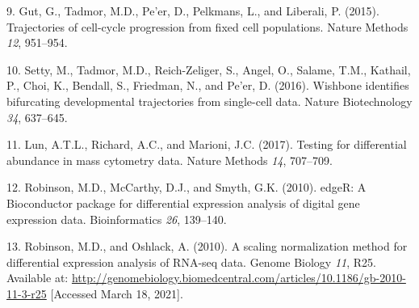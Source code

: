 \documentclass[
]{article}
\newenvironment{cslreferences}%
  {}%
  {\par}
\begin{document}
\begin{cslreferences}
\leavevmode\hypertarget{ref-gutTrajectoriesCellcycleProgression2015}{}%
9. Gut, G., Tadmor, M.D., Pe'er, D., Pelkmans, L., and Liberali, P. (2015). Trajectories of cell-cycle progression from fixed cell populations. Nature Methods \emph{12}, 951--954.

\leavevmode\hypertarget{ref-settyWishboneIdentifiesBifurcating2016}{}%
10. Setty, M., Tadmor, M.D., Reich-Zeliger, S., Angel, O., Salame, T.M., Kathail, P., Choi, K., Bendall, S., Friedman, N., and Pe'er, D. (2016). Wishbone identifies bifurcating developmental trajectories from single-cell data. Nature Biotechnology \emph{34}, 637--645.

\leavevmode\hypertarget{ref-lunTestingDifferentialAbundance2017}{}%
11. Lun, A.T.L., Richard, A.C., and Marioni, J.C. (2017). Testing for differential abundance in mass cytometry data. Nature Methods \emph{14}, 707--709.

\leavevmode\hypertarget{ref-robinsonEdgeRBioconductorPackage2010a}{}%
12. Robinson, M.D., McCarthy, D.J., and Smyth, G.K. (2010). edgeR: A Bioconductor package for differential expression analysis of digital gene expression data. Bioinformatics \emph{26}, 139--140.

\leavevmode\hypertarget{ref-robinsonTMM2010}{}%
13. Robinson, M.D., and Oshlack, A. (2010). A scaling normalization method for differential expression analysis of RNA-seq data. Genome Biology \emph{11}, R25. Available at: \url{http://genomebiology.biomedcentral.com/articles/10.1186/gb-2010-11-3-r25} {[}Accessed March 18, 2021{]}.
\end{cslreferences}
\end{document}
